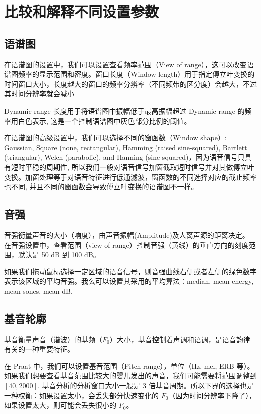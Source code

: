 \section{比较和解释不同设置参数}
\subsection{语谱图}
在语谱图的设置中，我们可以设置查看频率范围（View of range），这可以改变语谱图频率的显示范围和密度。窗口长度（Window length）用于指定傅立叶变换的时间窗口大小，长度越大的窗口的频率分辨率（不同频带的区分度）会越大，不过其时间分辨率就会减小

Dynamic range 长度用于将语谱图中振幅低于最高振幅超过 Dynamic range 的频率用白色表示, 这是一个控制语谱图中灰色部分比例的阈值。

在语谱图的高级设置中，我们可以选择不同的窗函数（Window shape）: Gaussian, Square (none, rectangular), Hamming (raised sine-squared), Bartlett (triangular), Welch (parabolic), and Hanning (sine-squared)，因为语音信号只具有短时平稳的周期性, 所以我们一般对语音信号加窗截取短时信号并对其做傅立叶变换。加窗处理等于对语音特征进行低通滤波，窗函数的不同选择对应的截止频率也不同, 并且不同的窗函数会导致傅立叶变换的语谱图不一样。

\subsection{音强}
音强衡量声音的大小（响度），由声音振幅(Amplitude)及人离声源的距离决定。
在音强设置中，查看范围（view of range）控制音强（黄线）的垂直方向的刻度范围，默认是 50 dB 到 100 dB。

如果我们拖动鼠标选择一定区域的语音信号，则音强曲线右侧或者左侧的绿色数字表示该区域的平均音强。我么可以设置其采用的平均算法：median, mean energy, mean sones, mean dB.

\subsection{基音轮廓}
基音衡量声音（谐波）的基频（$F_0$）大小，基音控制着声调和语调，是语音韵律有关的一种重要特征。

在 Praat 中，我们可以设置基音范围（Pitch range），单位（Hz, mel, ERB 等）。 如果我们想要查看基音范围比较大的婴儿发出的声音，我们可能需要将范围调整到 $[40, 2000]$. 基音分析的分析窗口大小一般是 3 倍基音周期。所以下界的选择也是一种权衡：如果设置太小，会丢失部分快速变化的 $F_0$（因为时间分辨率下降了），如果设置太大，则可能会丢失很小的 $F_0$。

